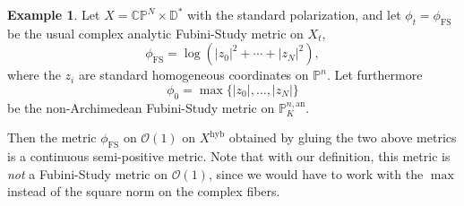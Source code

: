 \documentclass[JEP,XML,SOM,Unicode,published]{cedram}
\theoremstyle{definition}
\newtheorem{ex}[equation]{Example}
\newcommand \C{\mathbb C}
\newcommand \D {\mathbb{D}}
\newcommand \CP {\mathbb P}
\newcommand \gO {\mathcal O}
\newcommand{\an}{\mathrm{an}}
\DeclareMathOperator{\FS}{FS}
\newcommand{\hyb}{\mathrm{hyb}}
\begin{document}
\begin{ex} \label{ex homo}
Let $X = \C \CP^N \times \D^*$ with the standard polarization, and let $\phi_t = \phi_{\FS}$ be the usual complex analytic Fubini-Study metric on $X_t$, \ie
\[
\phi_{\FS} = \log (\lvert z_0 \rvert^2 +\cdots+ \lvert z_N \rvert^2),
\]
where the $z_i$ are standard homogeneous coordinates on $\CP^n$.
Let furthermore
\[
\phi_0= \max \{ \lvert z_0 \rvert,\dots, \lvert z_N \rvert \}
\]
be the non-Archimedean Fubini-Study metric on $\CP_K^{n, \an}$.

Then the metric $\phi_{\FS}$ on $\gO(1)$ on $X^{\hyb}$ obtained by gluing the two above metrics is a continuous semi-positive metric. Note that with our definition, this metric is \emph{not} a Fubini-Study metric on $\gO(1)$, since we would have to work with the $\max$ instead of the square norm on the complex fibers.
\end{ex}
\end{document}
